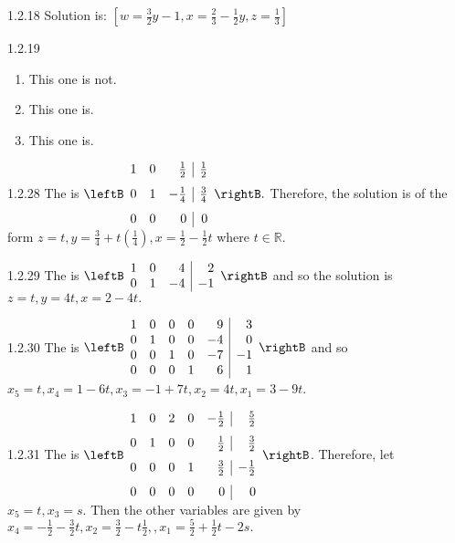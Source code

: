 \begin{Answer}{1.2.18}
Solution is: $\left[ w=\frac{3}{2}y-1,x=\frac{2}{3}-\frac{1}{2}y,z=\frac{1}{3
}\right] $
\end{Answer}
\begin{Answer}{1.2.19}
\begin{enumerate}
\item This one is not.
\item This one is.
\item This one is.
\end{enumerate}
\end{Answer}
\begin{Answer}{1.2.28}
The \rref\; is $\leftB
\begin{array}{rrr|r}
1 & 0 & \vspace{0.05in}\frac{1}{2} & \vspace{0.05in}\frac{1}{2} \\
0 & 1 & -\vspace{0.05in}\frac{1}{4} & \vspace{0.05in}\frac{3}{4} \\
0 & 0 & 0 & 0
\end{array}
\rightB .$ Therefore, the solution is of the form $z=t,y=\frac{3}{4}+t\left(
\frac{1}{4}\right) ,x=\frac{1}{2}-\frac{1}{2}t$ where $t\in \mathbb{R}$.
\end{Answer}
\begin{Answer}{1.2.29}
The \rref \;is $\leftB
\begin{array}{rrr|r}
1 & 0 & 4 & 2 \\
0 & 1 & -4 & -1
\end{array}
\rightB $ and so the solution is $z=t,y=4t,x=2-4t.$
\end{Answer}
\begin{Answer}{1.2.30}
The \rref \; is $\leftB
\begin{array}{rrrrr|r}
1 & 0 & 0 & 0 & 9 & 3 \\
0 & 1 & 0 & 0 & -4 & 0 \\
0 & 0 & 1 & 0 & -7 & -1 \\
0 & 0 & 0 & 1 & 6 & 1
\end{array}
\rightB $ and so $x_{5}=t,x_{4}=1-6t,x_{3}=-1+7t,x_{2}=4t,x_{1}=3-9t$.
\end{Answer}
\begin{Answer}{1.2.31}
The \rref \;is $\leftB
\begin{array}{rrrrr|r}
1 & 0 & 2 & 0 & -\vspace{0.05in}\frac{1}{2} & \vspace{0.05in}\frac{5}{2} \\
0 & 1 & 0 & 0 & \vspace{0.05in}\frac{1}{2} & \vspace{0.05in}\frac{3}{2} \\
0 & 0 & 0 & 1 & \vspace{0.05in}\frac{3}{2} & -\vspace{0.05in}\frac{1}{2} \\
0 & 0 & 0 & 0 & 0 & 0
\end{array}
\rightB $. Therefore, let $x_{5}=t,x_{3}=s.$ Then the other variables are
given by $x_{4}=-\frac{1}{2}-\frac{3}{2}t,x_{2}=\frac{3}{2}-t\frac{1}{2}
,,x_{1}=\frac{5}{2}+\frac{1}{2}t-2s.$
\end{Answer}

